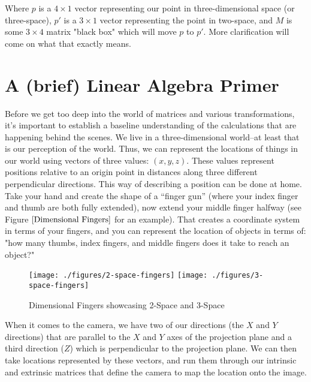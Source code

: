 \documentclass[
    12pt,
    twoside,
    bibstyle=chicago,
    headerstyle=uppercase,
	bibfile=thesis_updating.bib
]{reedthesis}
\begin{document}
Where $p$ is a $4\times1$ vector representing our point in three-dimensional space (or three-space), $p'$ is a $3\times1$ vector representing the point in two-space, and $M$ is some $3\times4$ matrix "black box" which will move $p$ to $p'$. More clarification will come on what that exactly means.

\section{A (brief) Linear Algebra Primer}
Before we get too deep into the world of matrices and various transformations, it's important to establish a baseline understanding of the calculations that are happening behind the scenes. We live in a three-dimensional world--at least that is our perception of the world. Thus, we can represent the locations of things in our world using vectors of three values: $(x, y, z)$. These values represent positions relative to an origin point in distances along three different perpendicular directions. This way of describing a position can be done at home. Take your hand and create the shape of a “finger gun” (where your index finger and thumb are both fully extended), now extend your middle finger halfway (see Figure $\ref{Dimensional Fingers}$ for an example). That creates a coordinate system in terms of your fingers, and you can represent the location of objects in terms of: "how many thumbs, index fingers, and middle fingers does it take to reach an object?" 

\begin{figure}[b]
	   
	       \centering
	    
	    \texttt{[image: ./figures/2-space-fingers]} 
		\hfill	    
	    \texttt{[image: ./figures/3-space-fingers]}
	     \caption{Dimensional Fingers showcasing 2-Space and 3-Space}
	 \label{Dimensional Fingers}
	\end{figure}

When it comes to the camera, we have two of our directions (the $X$ and $Y$ directions) that are parallel to the $X$ and $Y$ axes of the projection plane and a third direction ($Z$) which is perpendicular to the projection plane. We can then take locations represented by these vectors, and run them through our intrinsic and extrinsic matrices that define the camera to map the location onto the image.
\end{document}

